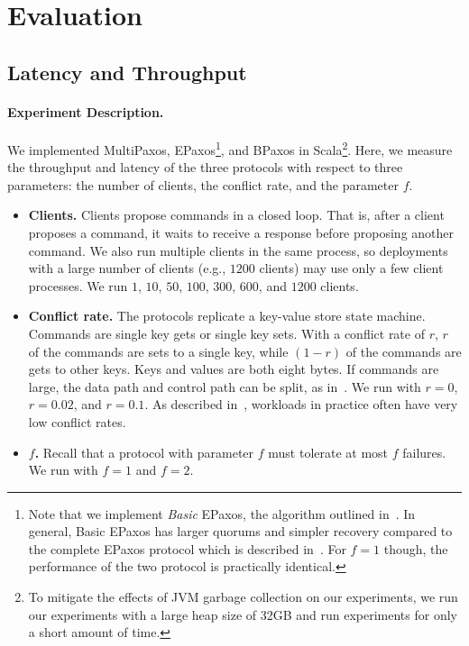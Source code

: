\section{Evaluation}

\subsection{Latency and Throughput}
{}

\paragraph{Experiment Description.}
We implemented MultiPaxos, EPaxos\footnote{%
  Note that we implement \emph{Basic} EPaxos, the algorithm outlined
  in~\cite{moraru2013proof}. In general, Basic EPaxos has larger quorums and
  simpler recovery compared to the complete EPaxos protocol which is described
  in~\cite{moraru2013there}. For $f=1$ though, the performance of the two
  protocol is practically identical.
}, and BPaxos in Scala\footnote{%
  To mitigate the effects of JVM garbage collection on our experiments, we run
  our experiments with a large heap size of 32GB and run experiments for only a
  short amount of time.
}. Here, we measure the throughput and latency of the three protocols with
respect to three parameters: the number of clients, the conflict rate, and the
parameter $f$.

\begin{itemize}
  \item \textbf{Clients.}
    Clients propose commands in a closed loop. That is, after a client proposes
    a command, it waits to receive a response before proposing another command.
    We also run multiple clients in the same process, so deployments with a
    large number of clients (e.g., $1200$ clients) may use only a few client
    processes. We run $1$, $10$, $50$, $100$, $300$, $600$, and $1200$ clients.

  \item \textbf{Conflict rate.}
    The protocols replicate a key-value store state machine. Commands are
    single key gets or single key sets. With a conflict rate of $r$, $r$ of the
    commands are sets to a single key, while $(1 - r)$ of the commands are gets
    to other keys. Keys and values are both eight bytes. If commands are large,
    the data path and control path can be split, as in~\cite{biely2012s}. We
    run with $r=0$, $r=0.02$, and $r=0.1$. As described
    in~\cite{moraru2013there}, workloads in practice often have very low
    conflict rates.

  \item \textbf{$f$.}
    Recall that a protocol with parameter $f$ must tolerate at most $f$ failures.
    We run with $f=1$ and $f=2$.
\end{itemize}

